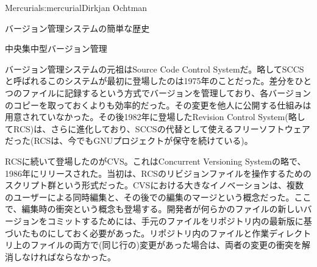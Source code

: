 \begin{aosachapter}{Mercurial}{s:mercurial}{Dirkjan Ochtman}
\begin{aosasect1}{バージョン管理システムの簡単な歴史}
\begin{aosasect2}{中央集中型バージョン管理}

バージョン管理システムの元祖はSource Code Control Systemだ。略してSCCSと呼ばれるこのシステムが最初に登場したのは1975年のことだった。差分をひとつのファイルに記録するという方式でバージョンを管理しており、各バージョンのコピーを取っておくよりも効率的だった。その変更を他人に公開する仕組みは用意されていなかった。その後1982年に登場したRevision Control System(略してRCS)は、さらに進化しており、SCCSの代替として使えるフリーソフトウェアだった(RCSは、今でもGNUプロジェクトが保守を続けている)。

RCSに続いて登場したのがCVS。これはConcurrent Versioning Systemの略で、1986年にリリースされた。当初は、RCSのリビジョンファイルを操作するためのスクリプト群という形式だった。CVSにおける大きなイノベーションは、複数のユーザーによる同時編集と、その後での編集のマージという概念だった。ここで、編集時の衝突という概念も登場する。開発者が何らかのファイルの新しいバージョンをコミットするためには、手元のファイルをリポジトリ内の最新版に基づいたものにしておく必要があった。リポジトリ内のファイルと作業ディレクトリ上のファイルの両方で(同じ行の)変更があった場合は、両者の変更の衝突を解消しなければならなかった。


\end{aosasect2}
\end{aosasect1}
\end{aosachapter}
